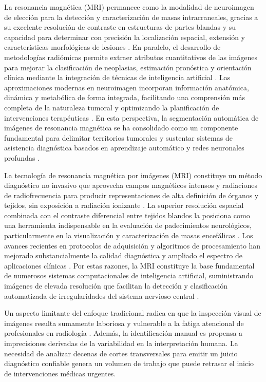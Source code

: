 La resonancia magnética (MRI) permanece como la modalidad de neuroimagen de elección para la detección y caracterización de masas intracraneales, gracias a su excelente resolución de contraste en estructuras de partes blandas y su capacidad para determinar con precisión la localización espacial, extensión y características morfológicas de lesiones \cite{Martucci2023}. En paralelo, el desarrollo de metodologías radiómicas permite extraer atributos cuantitativos de las imágenes para mejorar la clasificación de neoplasias, estimación pronóstica y orientación clínica mediante la integración de técnicas de inteligencia artificial \cite{Wang2025}. Las aproximaciones modernas en neuroimagen incorporan información anatómica, dinámica y metabólica de forma integrada, facilitando una comprensión más completa de la naturaleza tumoral y optimizando la planificación de intervenciones terapéuticas \cite{Nikam2022}. En esta perspectiva, la segmentación automática de imágenes de resonancia magnética se ha consolidado como un componente fundamental para delimitar territorios tumorales y sustentar sistemas de asistencia diagnóstica basados en aprendizaje automático y redes neuronales profundas \cite{Mohammed2023}.

La tecnología de resonancia magnética por imágenes (MRI) constituye un método diagnóstico no invasivo que aprovecha campos magnéticos intensos y radiaciones de radiofrecuencia para producir representaciones de alta definición de órganos y tejidos, sin exposición a radiación ionizante \cite{AhmedAbdullahAbdulazizALRabah2024}\cite{Taha2024}. La superior resolución espacial combinada con el contraste diferencial entre tejidos blandos la posiciona como una herramienta indispensable en la evaluación de padecimientos neurológicos, particularmente en la visualización y caracterización de masas encefálicas \cite{AhmedAbdullahAbdulazizALRabah2024}\cite{Hussain2022}. Los avances recientes en protocolos de adquisición y algoritmos de procesamiento han mejorado substancialmente la calidad diagnóstica y ampliado el espectro de aplicaciones clínicas \cite{Alsaedi2024}. Por estas razones, la MRI constituye la base fundamental de numerosos sistemas computacionales de inteligencia artificial, suministrando imágenes de elevada resolución que facilitan la detección y clasificación automatizada de irregularidades del sistema nervioso central \cite{Alsaedi2024}\cite{Hussain2022}\cite{Taha2024}.

Un aspecto limitante del enfoque tradicional radica en que la inspección visual de imágenes resulta sumamente laboriosa y vulnerable a la fatiga atencional de profesionales en radiología \cite{Abdusalomov2023}. Además, la identificación manual es propensa a imprecisiones derivadas de la variabilidad en la interpretación humana. La necesidad de analizar decenas de cortes transversales para emitir un juicio diagnóstico confiable genera un volumen de trabajo que puede retrasar el inicio de intervenciones médicas urgentes.

